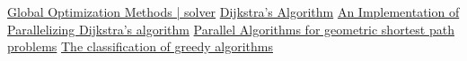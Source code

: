 \documentclass[letterpaper, 10 pt, conference]{ieeeconf}  %
\begin{document}
\begin{thebibliography}{99}

 
 \href{https://www.solver.com/global-optimization#:~:text=A\%20locally\%20optimal\%20solution\%20is\%20one\%20where\%20there,\%22in\%20the\%20vicinity\%22\%20with\%20better\%20objective\%20function\%20values.}{Global Optimization Methods | solver}
 \href{https://en.wikipedia.org/wiki/Dijkstra\%27s_algorithm}{Dijkstra's Algorithm}
 \href{https://cse.buffalo.edu/faculty/miller/Courses/CSE633/Ye-Fall-2012-CSE633.pdf}{An Implementation of Parallelizing Dijkstra’s algorithm}
 \href{https://citeseerx.ist.psu.edu/viewdoc/download?doi=10.1.1.64.8113&rep=rep1&type=pdf}{ Parallel Algorithms for geometric shortest path problems}
 \href{https://core.ac.uk/download/pdf/82042073.pdf}{The classification of greedy algorithms}




\end{thebibliography}
\end{document}

